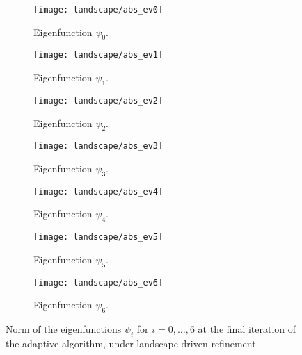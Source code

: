 \documentclass[12pt]{amsart}
\begin{document}
\begin{figure}[htbp]
    \begin{subfigure}[t]{0.49\textwidth}
        \centering
        \texttt{[image: landscape/abs\_ev0]}
        \caption{Eigenfunction \(\psi_0\).}
        \label{fig:eigenfunction_0}
    \end{subfigure}
    \begin{subfigure}[t]{0.49\textwidth}
        \centering
        \texttt{[image: landscape/abs\_ev1]}
        \caption{Eigenfunction \(\psi_1\).}
        \label{fig:eigenfunction_1}
    \end{subfigure}
    \vspace{1cm}
    \begin{subfigure}[t]{0.49\textwidth}
        \centering
        \texttt{[image: landscape/abs\_ev2]}
        \caption{Eigenfunction \(\psi_2\).}
        \label{fig:eigenfunction_2}
    \end{subfigure}
    \begin{subfigure}[t]{0.49\textwidth}
        \centering
        \texttt{[image: landscape/abs\_ev3]}
        \caption{Eigenfunction \(\psi_3\).}
        \label{fig:eigenfunction_3}
    \end{subfigure}
    \vspace{1cm}
    \begin{subfigure}[t]{0.49\textwidth}
        \centering
        \texttt{[image: landscape/abs\_ev4]}
        \caption{Eigenfunction \(\psi_4\).}
        \label{fig:eigenfunction_4}
    \end{subfigure}
    \begin{subfigure}[t]{0.49\textwidth}
        \centering
        \texttt{[image: landscape/abs\_ev5]}
        \caption{Eigenfunction \(\psi_5\).}
        \label{fig:eigenfunction_5}
    \end{subfigure}
    \vspace{1cm}
    \begin{subfigure}[t]{0.49\textwidth}
        \centering
        \texttt{[image: landscape/abs\_ev6]}
        \caption{Eigenfunction \(\psi_6\).}
        \label{fig:eigenfunction_6}
    \end{subfigure}
    \caption{Norm of the eigenfunctions \(\psi_i\) for \(i = 0, \ldots, 6\) at the final iteration of the adaptive algorithm, under landscape-driven refinement.}
\end{figure}
\end{document}
